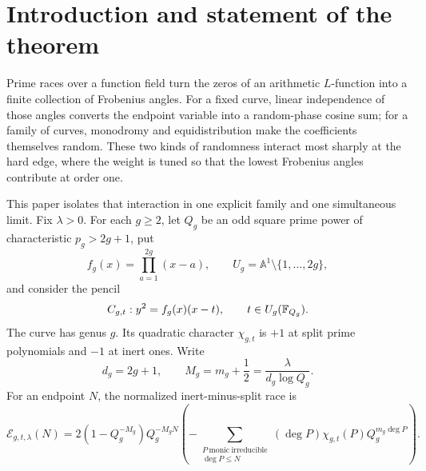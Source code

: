 \begin{abstract}
We study a weighted inert-versus-split prime race in the one-parameter hyperelliptic
pencil
\(y^2=\prod_{a=1}^{2g}(x-a)(x-t)\) over finite fields.  For each curve, the
normalized race sequence has a Ces\`aro endpoint law.  In the critical
scaling \(m+1/2=\lambda/((2g+1)\log Q)\), we prove that these quenched laws,
viewed as random elements of \(\mathcal P_2(\mathbb R)\), converge to the
random law generated by a marked symplectic hard-edge process.  The limit is
simultaneous in genus and field size for odd square prime powers satisfying
\(\log Q/(g^2\log(g+2))\to\infty\), and we give a completely specified
sequence of fields.  The limiting random measure and its positive-half-line
mass are both nonconstant.  The proof combines density-one linear
independence, genus-explicit Frobenius equidistribution, heat-kernel smoothing,
and direct \(W_2\) control of the marked series.  This is a
large-field/large-genus bridge theorem, not a fixed-field microscopic result.
\end{abstract}

\section{Introduction and statement of the theorem}
\label{sec:introduction}

Prime races over a function field turn the zeros of an arithmetic
\(L\)-function into a finite collection of Frobenius angles.  For a fixed
curve, linear independence of those angles converts the endpoint variable
into a random-phase cosine sum; for a family of curves, monodromy and
equidistribution make the coefficients themselves random.  These two kinds of
randomness interact most sharply at the hard edge, where the weight is tuned
so that the lowest Frobenius angles contribute at order one.

This paper isolates that interaction in one explicit family and one
simultaneous limit.  Fix \(\lambda>0\).  For each \(g\ge2\), let \(Q_g\) be an
odd square prime power of characteristic \(p_g>2g+1\), put
\[
 f_g(x)=\prod_{a=1}^{2g}(x-a),\qquad
 U_g=\mathbb A^1\setminus\{1,\ldots,2g\},
\]
and consider the pencil
\begin{equation}
 C_{g,t}:y^2=f_g(x)(x-t),\qquad t\in U_g(\mathbb F_{Q_g}).
\label{eq:pencil}
\end{equation}
The curve has genus \(g\).  Its quadratic character \(\chi_{g,t}\) is
\(+1\) at split prime polynomials and \(-1\) at inert ones.  Write
\begin{equation}
 d_g=2g+1,\qquad
 M_g=m_g+\frac12=\frac{\lambda}{d_g\log Q_g}.
\label{eq:critical-scale}
\end{equation}
For an endpoint \(N\), the normalized inert-minus-split race is
\begin{equation}
 \mathcal E_{g,t,\lambda}(N)
 =2(1-Q_g^{-M_g})Q_g^{-M_gN}
 \left(-\sum_{\substack{P\ \mathrm{monic\ irreducible}\\ \deg P\le N}}
       (\deg P)\chi_{g,t}(P)Q_g^{m_g\deg P}\right).
\label{eq:race}
\end{equation}

